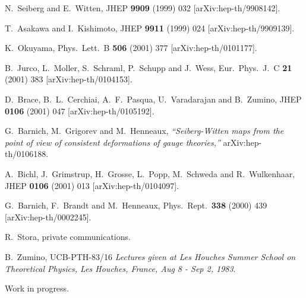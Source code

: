 \documentclass[a4paper,12pt]{article}
\begin{document}
\begin{thebibliography}{99}

N.~Seiberg and E.~Witten,
JHEP {\bf 9909} (1999) 032
[arXiv:hep-th/9908142].

T.~Asakawa and I.~Kishimoto,
JHEP {\bf 9911} (1999) 024
[arXiv:hep-th/9909139].

K.~Okuyama,
Phys.\ Lett.\ B {\bf 506} (2001) 377
[arXiv:hep-th/0101177].

B.~Jurco, L.~Moller, S.~Schraml, P.~Schupp and J.~Wess,
Eur.\ Phys.\ J.\ C {\bf 21} (2001) 383
[arXiv:hep-th/0104153].

D.~Brace, B.~L.~Cerchiai, A.~F.~Pasqua, U.~Varadarajan and B.~Zumino,
JHEP {\bf 0106} (2001) 047
[arXiv:hep-th/0105192].

G.~Barnich, M.~Grigorev and M.~Henneaux,
{\em ``Seiberg-Witten maps from the point of view of consistent deformations  of gauge theories,''}
arXiv:hep-th/0106188.

A.~Bichl, J.~Grimstrup, H.~Grosse, L.~Popp, M.~Schweda and R.~Wulkenhaar,
JHEP {\bf 0106} (2001) 013
[arXiv:hep-th/0104097].

G.~Barnich, F.~Brandt and M.~Henneaux,
Phys.\ Rept.\  {\bf 338} (2000) 439
[arXiv:hep-th/0002245].

R.~Stora, private communications.

B.~Zumino,
UCB-PTH-83/16
{\it Lectures given at Les Houches Summer School on Theoretical Physics, Les Houches, France, Aug 8 - Sep 2, 1983}.

Work in progress.

\end{thebibliography}
\end{document}
